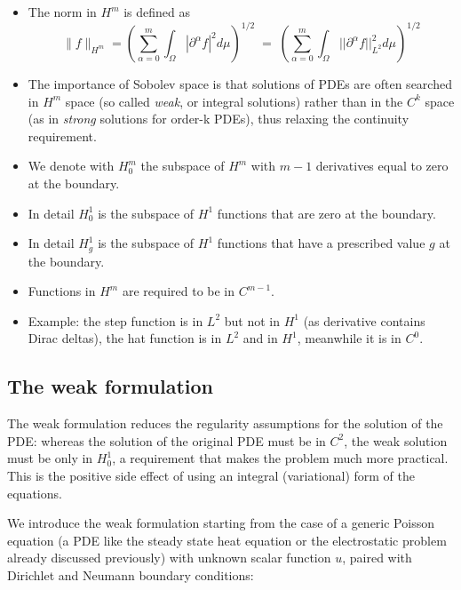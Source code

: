 \documentclass{digitaldynamics}
\begin{document}
\begin{itemize}
\begin{itemize}
		\item The norm in $H^m$ is defined as
		\[
		\| f \|_{H^m} = \left( \sum_{\alpha=0}^m \int_\Omega |\partial^\alpha f|^2 d\mu \right)^{1/2} \; = \; 
							    \left( \sum_{\alpha=0}^m \int_\Omega ||\partial^\alpha f||^2_{L^2} d\mu \right)^{1/2}
		\]
		

		\item The importance of Sobolev space is that solutions of PDEs are often searched in $H^m$ space (so called \textit{weak}, or integral solutions) rather than in the $C^k$ space (as in \textit{strong} solutions for order-k PDEs), thus relaxing the continuity requirement.
		
		\item We denote with $H^m_0$ the subspace of $H^m$ with $m-1$ derivatives equal to zero at the boundary.
		
		\item In detail $H^1_0$ is the subspace of $H^1$ functions that are zero at the boundary. 
		
		\item In detail $H^1_g$ is the subspace of $H^1$ functions that have a prescribed value $g$ at the boundary.
		
		\item Functions in $H^m$ are required to be in $C^{m-1}$.
		
		\item Example: the step function is in $L^2$ but not in $H^1$ (as derivative contains Dirac deltas), the hat function is in $L^2$ and in $H^1$, meanwhile it is in $C^0$. 
		
	\end{itemize}
	
\end{itemize}

\subsection{The weak formulation}

The weak formulation reduces the regularity assumptions for the solution of the PDE: whereas the solution of the original PDE must be in $C^2$, the weak solution must be only in $H^1_0$, a requirement that makes the problem much more practical. This is the positive side effect of using an integral (variational) form of the equations. 

We introduce the weak formulation starting from the case of a generic Poisson equation (a PDE like the steady state heat equation or the electrostatic problem already discussed previously) with unknown scalar function $u$, paired with Dirichlet and Neumann boundary conditions:
\end{document}
